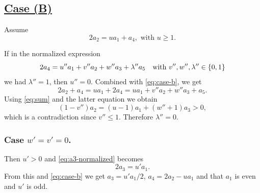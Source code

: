 \documentclass[12pt]{amsart}
\begin{document}
\medskip

\subsection{\underline{Case (B)}}
 Assume 
\begin{equation}
\label{eq:case-b}
2 a_2= u a_1 + a_4, \text{  with }u \geq 1.
\end{equation}
 
If in the normalized expression 
$$
2 a_4= u'' a_1+ v'' a_2+ w'' a_3+\lambda'' a_5 \text{\quad with } v'', w'', \lambda'' \in\{0,1\}
$$ 
we had $\lambda''=1$, then  $u''=0$.
Combined with \eqref{eq:case-b}, we get
$$
2a_2+a_4= ua_1+ 2 a_4= u a_1 +v'' a_2 +w''a_3+a_5.
$$
Using \eqref{eq:sum} and  the latter equation we obtain
$$
(1-v'')a_2= (u-1)a_1+ (w''+1) a_3 >0,
$$
which is a contradiction since $v'' \leq 1$. Therefore $\lambda''=0$.

 
\subsubsection{Case \underline{$w'=v'=0$}.} 
  \label{ss:test} 
	Then $u'>0$ and \eqref{eq:a3-normalized} becomes
	\begin{equation}
		2 a_3= u' a_1.
	\end{equation}
 From this and \eqref{eq:case-b} we get $a_3=u'a_1/2$, $a_4=2a_2-u a_1$ and that $a_1$ is even and $u'$ is odd.
 
\end{document}
